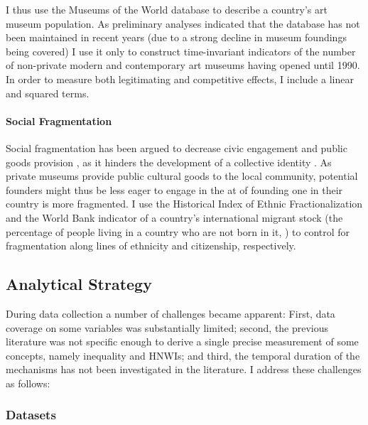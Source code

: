 \documentclass[11pt, authoryear]{elsarticle}
\begin{document}
I thus use the Museums of the World database \citep{deGruyter_2021_MOW} to describe a country's art museum population. 
As preliminary analyses indicated that the database has not been maintained in recent years (due to a strong decline in museum foundings being covered) I use it only to construct time-invariant indicators of the number of non-private modern and contemporary art museums having opened until 1990.
In order to measure both legitimating and competitive effects, I include a linear and squared terms.

\paragraph*{Social Fragmentation}


Social fragmentation has been argued to decrease civic engagement \citep{Costa_Kahn_2003_heterogeneity} and public goods provision \citep{Alesina_Baqir_1999_publicgoods}, as it hinders the development of a collective identity \citep{Habyarimana_etal_2009_coethnicity,Baldassarri_Abascal_2020_diversity}.
As private museums provide public cultural goods to the local community, potential founders might thus be less eager to engage in the at of founding one in their country is more fragmented.
I use the Historical Index of Ethnic Fractionalization \citep{Drazanova_2020_HIEF} and the World Bank indicator of a country's international migrant stock (the percentage of people living in a country who are not born in it, \citealt{WB_2024_mist}) to control for fragmentation along lines of ethnicity and citizenship, respectively. 


\subsection*{Analytical Strategy}


During data collection a number of challenges became apparent:
First, data coverage on some variables was substantially limited; second, the previous literature was not specific enough to derive a single precise measurement of some concepts, namely inequality and HNWIs; and third, the temporal duration of the mechanisms has not been investigated in the literature. 
I address these challenges as follows: 

\subsubsection*{Datasets}
\end{document}
